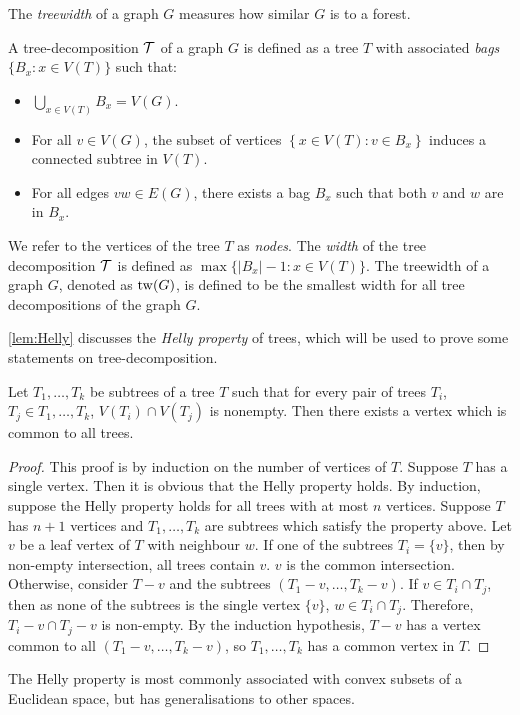 The \textit{treewidth} of a graph \(G\) measures how similar $G$ is to a forest.
\begin{definition}\label{def:tree-decomposition}
	A tree-decomposition \(\mathcal{T}\) of a graph \(G\) is defined as a tree \(T\) with associated \textit{bags} \(\lbrace B_x : x \in V(T) \rbrace\) such that:
	\begin{itemize}
		\item $\bigcup_{x \in V(T)} B_x = V(G)$.
		\item For all \(v \in V(G)\), the subset of vertices \(\left\lbrace x \in V(T): v \in B_x \right\rbrace\) induces a connected subtree in \(V(T)\).
		\item For all edges \(vw \in E(G)\), there exists a bag \(B_x\) such that both \(v\) and \(w\) are in \(B_x\).
	\end{itemize}
\end{definition}
We refer to the vertices of the tree \(T\) as \textit{nodes}.
The \textit{width} of the tree decomposition \(\mathcal{T}\) is defined as \(\max \lbrace |B_x| - 1 : x \in V(T) \rbrace\).
The treewidth of a graph \(G\), denoted as \(\operatorname{tw}(G)\), is defined to be the smallest width for all tree decompositions of the graph \(G\). 

\cref{lem:Helly} discusses the \textit{Helly property} of trees, which will be used to prove some statements on tree-decomposition. 

\begin{lemma}\label{lem:Helly}
	Let \(T_1, \ldots, T_k\) be subtrees of a tree \(T\) such that for every pair of trees $T_i$, $T_j \in T_1, \ldots, T_k$, $V(T_i) \cap V(T_j)$ is nonempty. Then there exists a vertex which is common to all trees.
\end{lemma}
\begin{proof}
	This proof is by induction on the number of vertices of $T$. Suppose $T$ has a single vertex. Then it is obvious that the Helly property holds. By induction, suppose the Helly property holds for all trees with at most $n$ vertices. Suppose $T$ has $n + 1$ vertices and \(T_1, \ldots, T_k\) are subtrees which satisfy the property above. Let $v$ be a leaf vertex of $T$ with neighbour $w$. If one of the subtrees $T_i = \{v\}$, then by non-empty intersection, all trees contain $v$. $v$ is the common intersection. Otherwise, consider $T - v$ and the subtrees $(T_1 - v, \ldots, T_k - v)$. If $v \in T_i \cap T_j$, then as none of the subtrees is the single vertex $\{v\}$, $w \in T_i \cap T_j$. Therefore, $T_i - v \cap T_j - v$ is non-empty. By the induction hypothesis, $T - v$ has a vertex common to all $(T_1 - v, \ldots, T_k - v)$, so \(T_1, \ldots, T_k\) has a common vertex in $T$. 
\end{proof}
The Helly property is most commonly associated with convex subsets of a Euclidean space, but has generalisations to other spaces. 

